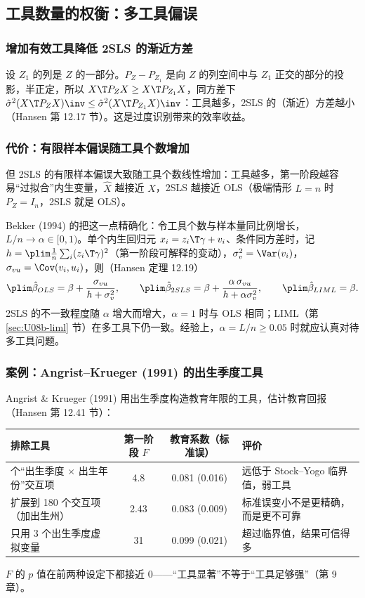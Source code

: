 \subsection{工具数量的权衡：多工具偏误}\label{sec:U08b-many}

\subsubsection{增加有效工具降低 2SLS 的渐近方差}

设 $Z_1$ 的列是 $Z$ 的一部分。$P_Z-P_{Z_1}$ 是向 $Z$ 的列空间中与 $Z_1$ 正交的部分的投影，半正定，所以 $X\T P_ZX\ge X\T P_{Z_1}X$，同方差下 $\hat\sigma^2(X\T P_ZX)\inv\le\hat\sigma^2(X\T P_{Z_1}X)\inv$：工具越多，2SLS 的（渐近）方差越小（Hansen 第 12.17 节）。这是过度识别带来的效率收益。

\subsubsection{代价：有限样本偏误随工具个数增加}

但 2SLS 的有限样本偏误大致随工具个数线性增加：工具越多，第一阶段越容易“过拟合”内生变量，$\hat X$ 越接近 $X$，2SLS 越接近 OLS（极端情形 $L=n$ 时 $P_Z=I_n$，2SLS 就是 OLS）。

Bekker (1994) 的把这一点精确化：令工具个数与样本量同比例增长，$L/n\to\alpha\in[0,1)$。单个内生回归元 $x_i=z_i\T\gamma+v_i$、条件同方差时，记 $h=\plim\frac1n\sum_i(z_i\T\gamma)^2$（第一阶段可解释的变动），$\sigma_v^2=\Var(v_i)$，$\sigma_{vu}=\Cov(v_i,u_i)$，则（Hansen 定理 12.19）
\[
\plim\hat\beta_{OLS}=\beta+\frac{\sigma_{vu}}{h+\sigma_v^2},\qquad
\plim\hat\beta_{2SLS}=\beta+\frac{\alpha\,\sigma_{vu}}{h+\alpha\sigma_v^2},\qquad
\plim\hat\beta_{LIML}=\beta .
\]
2SLS 的不一致程度随 $\alpha$ 增大而增大，$\alpha=1$ 时与 OLS 相同；LIML（第 \ref{sec:U08b-liml} 节）在多工具下仍一致。经验上，$\alpha=L/n\ge0.05$ 时就应认真对待多工具问题。

\subsubsection{案例：Angrist--Krueger (1991) 的出生季度工具}

Angrist \& Krueger (1991) 用出生季度构造教育年限的工具，估计教育回报（Hansen 第 12.41 节）：
\begin{center}
\small
\begin{tabularx}{\linewidth}{>{\raggedright\arraybackslash}p{5.0cm}ccL}
\toprule
排除工具 & 第一阶段 $F$ & 教育系数（标准误） & 评价\\
 个“出生季度 $\times$ 出生年份”交互项 & 4.8 & 0.081 (0.016) & 远低于 Stock--Yogo 临界值，弱工具\\
扩展到 180 个交互项（加出生州） & 2.43 & 0.083 (0.009) & 标准误变小不是更精确，而是更不可靠\\
只用 3 个出生季度虚拟变量 & 31 & 0.099 (0.021) & 超过临界值，结果可信得多\\
\bottomrule
\end{tabularx}
\end{center}
$F$ 的 $p$ 值在前两种设定下都接近 $0$——“工具显著”不等于“工具足够强”（第 9 章）。

